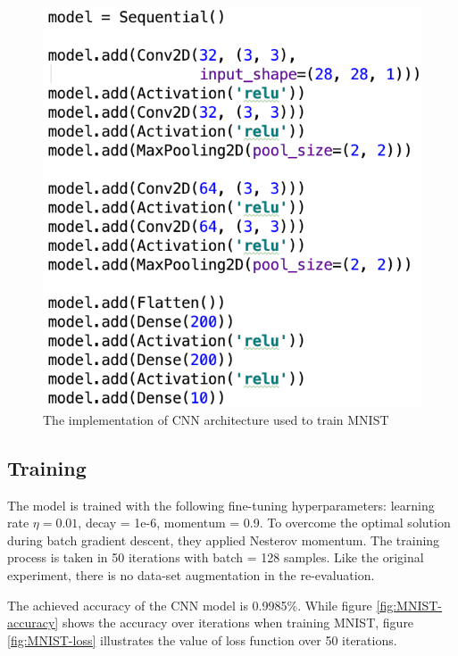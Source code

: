 \documentclass[12pt]{article}
\begin{document}
\begin{figure}[H]
	\centering
	\caption{The implementation of CNN architecture used to train MNIST}
	\label{fig:MNIST-implementation}
	\includegraphics[scale=0.7]{img/MNIST}
\end{figure}


\subsection{Training}
The model is trained with the following fine-tuning hyperparameters: learning rate $\eta = 0.01$, decay = 1e-6, momentum = 0.9. To overcome the optimal solution during batch gradient descent, they applied Nesterov momentum. The training process is taken in 50 iterations with batch = 128 samples. Like the original experiment, there is no data-set augmentation in the re-evaluation.

The achieved accuracy of the CNN model is 0.9985\%. While figure \ref{fig:MNIST-accuracy} shows the accuracy over iterations when training MNIST, figure \ref{fig:MNIST-loss} illustrates the value of loss function over 50 iterations.
\end{document}
